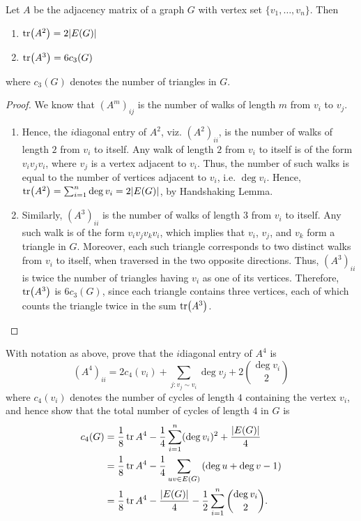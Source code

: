 \begin{Theorem}
Let $A$ be the adjacency matrix of a graph $G$ with vertex set $\{v_1, \ldots, v_n\}$. Then
\begin{enumerate}[label=(\roman*)]
\item $\tr(A^2) = 2 |E(G)|$
\item $\tr(A^3) = 6 c_3(G)$
\end{enumerate}
where $c_3(G)$ denotes the number of triangles in $G$.
\end{Theorem}

\begin{proof}
We know that $(A^m)_{ij}$ is the number of walks of length $m$ from $v_i$ to $v_j$.
\begin{enumerate}[label=(\roman*)]
\item Hence, the $i$\nth diagonal entry of $A^2$, viz. $(A^2)_{ii}$, is the number of walks of length $2$ from $v_i$ to itself. Any walk of length $2$ from $v_i$ to itself is of the form $v_i v_j v_i$, where $v_j$ is a vertex adjacent to $v_i$. Thus, the number of such walks is equal to the number of vertices adjacent to $v_i$, i.e. $\deg v_i$. Hence, $\tr(A^2) = \sum_{i=1}^n \deg v_i = 2|E(G)|$, by Handshaking Lemma.

\item Similarly, $(A^3)_{ii}$ is the number of walks of length $3$ from $v_i$ to itself. Any such walk is of the form $v_i v_j v_k v_i$, which implies that $v_i$, $v_j$, and $v_k$ form a triangle in $G$. Moreover, each such triangle corresponds to two distinct walks from $v_i$ to itself, when traversed in the two opposite directions. Thus, $(A^3)_{ii}$ is twice the number of triangles having $v_i$ as one of its vertices. Therefore, $\tr(A^3)$ is $6 c_3(G)$, since each triangle contains three vertices, each of which counts the triangle twice in the sum $\tr(A^3)$.
\end{enumerate}
\end{proof}

\begin{Exercise}
With notation as above, prove that the $i$\nth diagonal entry of $A^4$ is
\begin{equation*}
	(A^4)_{ii} = 2c_4(v_i) + \sum_{j \colon v_j \sim v_i} \deg v_j + 2 \binom{\deg v_i}{2}
\end{equation*}
where $c_4(v_i)$ denotes the number of cycles of length $4$ containing the vertex $v_i$, and hence show that the total number of cycles of length $4$ in $G$ is
\begin{align*}
	c_4(G) & = \frac 1 8 \tr A^4 - \frac 1 4 \sum_{i=1}^{n} (\deg v_i)^2 + \frac{|E(G)|}{4} \\
	& = \frac 1 8 \tr A^4 - \frac 1 4 \sum_{uv \in E(G)} \pqty{\deg u + \deg v - 1} \\
	& = \frac 1 8 \tr A^4 - \frac {|E(G)|} 4 - \frac 1 2 \sum_{i=1}^n \binom {\deg v_i} 2.
\end{align*}
\end{Exercise}



